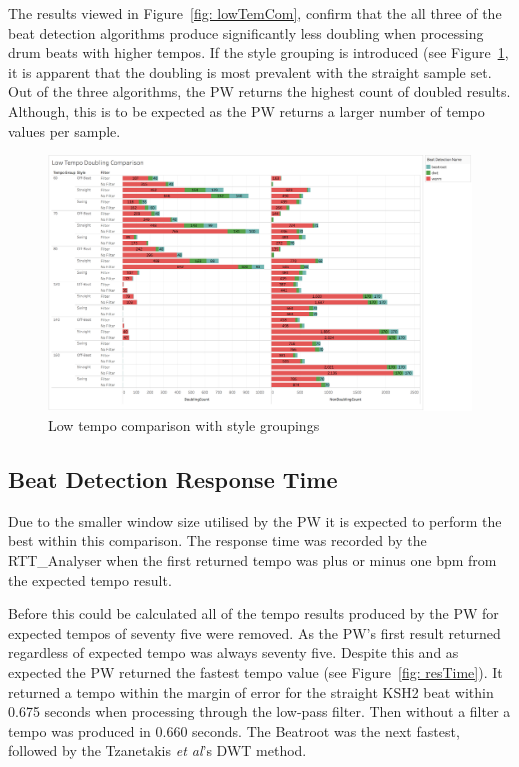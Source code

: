 \documentclass[a4paper, 11pt]{article}
\begin{document}
The results viewed in Figure~\ref{fig: lowTemCom}, confirm that the all three of the beat detection algorithms produce significantly less doubling when processing drum beats with higher tempos. If the style grouping is introduced (see Figure~\ref{fig: lowTemComStyle}, it is apparent that the doubling is most prevalent with the straight sample set. Out of the three algorithms, the PW returns the highest count of doubled results. Although, this is to be expected as the PW returns a larger number of tempo values per sample.

\begin{figure}
\centering
\includegraphics[scale=0.25]{images/lowStyle.jpg}
\caption{Low tempo comparison with style groupings}
\label{fig: lowTemComStyle}
\end{figure}

\subsection{Beat Detection Response Time}
Due to the smaller window size utilised by the PW it is expected to perform the best within this comparison. The response time was recorded by the RTT\_Analyser when the first returned tempo was plus or minus one bpm from the expected tempo result. 

Before this could be calculated all of the tempo results produced by the PW for expected tempos of seventy five were removed. As the PW's first result returned regardless of expected tempo was always seventy five. Despite this and as expected the PW returned the fastest tempo value (see Figure~\ref{fig: resTime}). It returned a tempo within the margin of error for the straight KSH2 beat within 0.675 seconds when processing through the low-pass filter. Then without a filter a tempo was produced in 0.660 seconds. The Beatroot was the next fastest, followed by the Tzanetakis \textit{et al}'s \cite{tzane1} DWT method.
\end{document}
